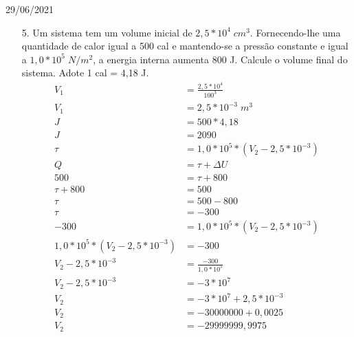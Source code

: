\documentclass{SchoolBook}
\begin{document}
\begin{day}{29/06/2021}
\begin{enumerate}
            \item[5.] Um sistema tem um volume inicial de $2,5 * 10^4\;cm^3$. Fornecendo-lhe uma quantidade de calor igual a 500 cal e mantendo-se a pressão constante e igual a $1,0 * 10^5\;N/m^2$, a energia interna aumenta 800 J. Calcule o volume final do sistema. Adote 1 cal = 4,18 J.
            \begin{align*}
                 V_1 &= \frac{2,5 * 10^4}{100^3} \\
                 V_1 &= 2,5 * 10^{-3}\;m^3 \\[3pt]
                   J &= 500 * 4,18 \\
                   J &= 2090       \\[3pt]
                \tau &= 1,0 * 10^5 * (V_2 - 2,5 * 10^{-3}) \\
                         Q &= \tau + \Delta U \\
                       500 &= \tau + 800      \\
                \tau + 800 &= 500             \\
                      \tau &= 500 - 800       \\
                      \tau &= -300            \\[3pt]
                -300 &= 1,0 * 10^5 * (V_2 - 2,5 * 10^{-3}) \\
                1,0 * 10^5 * (V_2 - 2,5 * 10^{-3}) &= -300 \\
                V_2 - 2,5 * 10^{-3} &= \frac{-300}{1,0 * 10^5} \\
                V_2 - 2,5 * 10^{-3} &= -3 * 10^7 \\
                V_2 &= -3 * 10^7 + 2,5 * 10^{-3} \\
                V_2 &= -30000000 + 0,0025 \\
                V_2 &= -29999999,9975
            \end{align*}
        \end{enumerate}
    \end{day}
    
\end{document}
